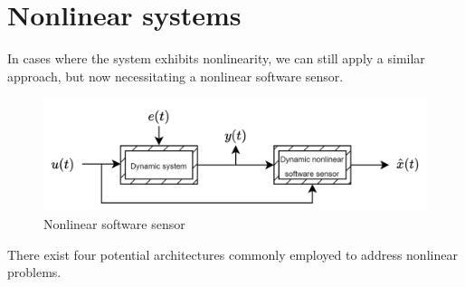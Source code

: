 \section{Nonlinear systems}

In cases where the system exhibits nonlinearity, we can still apply a similar approach, but now necessitating a nonlinear software sensor.
\begin{figure}[H]
    \centering
    \includegraphics[width=0.75\linewidth]{images/lin.png}
    \caption{Nonlinear software sensor}
\end{figure}
\noindent There exist four potential architectures commonly employed to address nonlinear problems.


